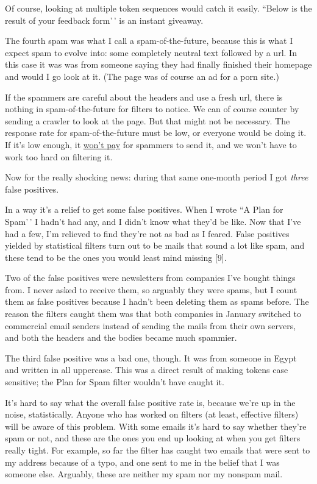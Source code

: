 Of course, looking at multiple token sequences would catch it easily.
``Below is the result of your feedback form'\,' is an instant giveaway.

The fourth spam was what I call a spam-of-the-future, because this is
what I expect spam to evolve into: some completely neutral text followed
by a url. In this case it was was from someone saying they had finally
finished their homepage and would I go look at it. (The page was of
course an ad for a porn site.)

If the spammers are careful about the headers and use a fresh url, there
is nothing in spam-of-the-future for filters to notice. We can of course
counter by sending a crawler to look at the page. But that might not be
necessary. The response rate for spam-of-the-future must be low, or
everyone would be doing it. If it's low enough, it
\href{wfks.html}{won't pay} for spammers to send it, and we won't have
to work too hard on filtering it.

Now for the really shocking news: during that same one-month period I
got \emph{three} false positives.

In a way it's a relief to get some false positives. When I wrote ``A
Plan for Spam'\,' I hadn't had any, and I didn't know what they'd be
like. Now that I've had a few, I'm relieved to find they're not as bad
as I feared. False positives yielded by statistical filters turn out to
be mails that sound a lot like spam, and these tend to be the ones you
would least mind missing {[}9{]}.

Two of the false positives were newsletters from companies I've bought
things from. I never asked to receive them, so arguably they were spams,
but I count them as false positives because I hadn't been deleting them
as spams before. The reason the filters caught them was that both
companies in January switched to commercial email senders instead of
sending the mails from their own servers, and both the headers and the
bodies became much spammier.

The third false positive was a bad one, though. It was from someone in
Egypt and written in all uppercase. This was a direct result of making
tokens case sensitive; the Plan for Spam filter wouldn't have caught it.

It's hard to say what the overall false positive rate is, because we're
up in the noise, statistically. Anyone who has worked on filters (at
least, effective filters) will be aware of this problem. With some
emails it's hard to say whether they're spam or not, and these are the
ones you end up looking at when you get filters really tight. For
example, so far the filter has caught two emails that were sent to my
address because of a typo, and one sent to me in the belief that I was
someone else. Arguably, these are neither my spam nor my nonspam mail.

